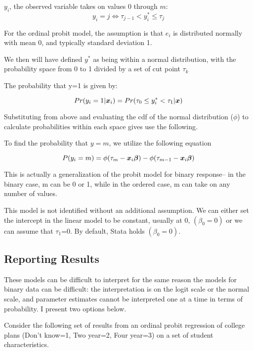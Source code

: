\documentclass[12 pt]{article}
\begin{document}
$y_i$, the observed variable takes on values $0$ through $m$:
\begin{equation*}
  y_i=j \iff \tau_{j-1}< y^*_i \leq \tau_{j} 
\end{equation*}

For the ordinal probit model, the assumption is that $e_i$ is
distributed normally with mean 0, and typically standard deviation 1. 

We then will have defined $y^*$ as being within a normal distribution,
with the probability space from 0 to 1 divided by a set of cut point $\tau_k$

The probability that y=1 is given by:

\begin{equation*}
  Pr(y_i=1| \boldsymbol{x}_i)=Pr(\tau_0\leq y_i^* < \tau_1|\boldsymbol{x})
\end{equation*}

Substituting from above and evaluating the cdf of the normal
distribution ($\phi$) to calculate probabilities within each space
gives use the following. 

To find the probability that $y=m$, we utilize the following equation

\begin{equation*}
  P(y_i=m)=\phi(\tau_m-\boldsymbol{x}_i\boldsymbol{\beta})-\phi(\tau_{m-1}-\boldsymbol{x}_i\boldsymbol{\beta})
\end{equation*}

This is actually a generalization of the probit model for binary
response-- in the binary case, m can be 0 or 1, while in the ordered
case, m can take on any number of values. 

This model is not identified without an additional assumption. We can
either set the intercept in the linear model to be constant, usually
at 0,  $(\beta_0=0)$ or we can assume
that $\tau_1$=0. By default, Stata holds $(\beta_0=0)$. 

\subsection{Reporting Results}
\label{sec:reporting-results}

These models can be difficult to interpret for the same reason the
models for binary data can be difficult: the interpretation is on the
logit scale or the normal scale, and parameter estimates cannot be
interpreted one at a time in terms of probability. I present two
options below. 

Consider the following set of results from an ordinal probit
regression of college plans (Don't know=1, Two year=2, Four year=3) on
a set of student characteristics. 
\end{document}
